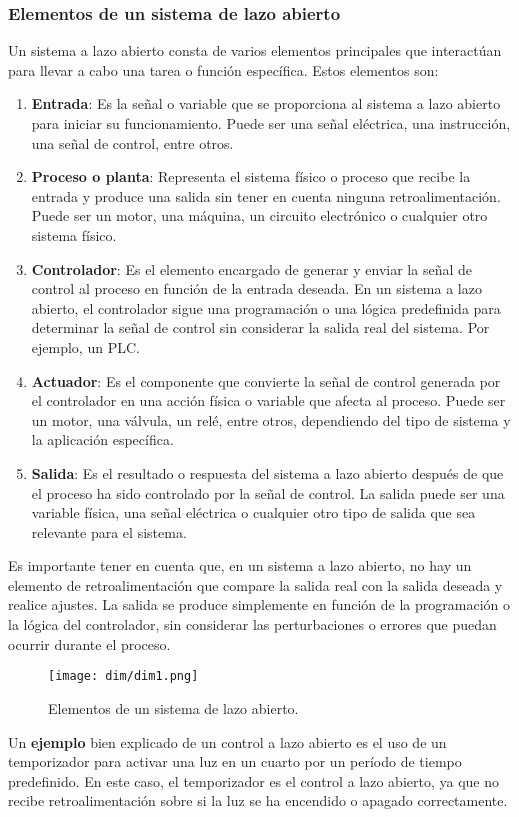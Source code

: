 \documentclass[
	12pt, %
	fleqn, %
	a4paper, %
	oneside, %
]{LegrandOrangeBook}
\begin{document}
\subsubsection{Elementos de un sistema de lazo abierto}
Un sistema a lazo abierto consta de varios elementos principales que interactúan para llevar a cabo una tarea o función específica. Estos elementos son:
\begin{enumerate}
\item \textbf{Entrada}: Es la señal o variable que se proporciona al sistema a lazo abierto para iniciar su funcionamiento. Puede ser una señal eléctrica, una instrucción, una señal de control, entre otros.
\item \textbf{Proceso o planta}: Representa el sistema físico o proceso que recibe la entrada y produce una salida sin tener en cuenta ninguna retroalimentación. Puede ser un motor, una máquina, un circuito electrónico o cualquier otro sistema físico.
\item \textbf{Controlador}: Es el elemento encargado de generar y enviar la señal de control al proceso en función de la entrada deseada. En un sistema a lazo abierto, el controlador sigue una programación o una lógica predefinida para determinar la señal de control sin considerar la salida real del sistema. Por ejemplo, un PLC.
\item \textbf{Actuador}: Es el componente que convierte la señal de control generada por el controlador en una acción física o variable que afecta al proceso. Puede ser un motor, una válvula, un relé, entre otros, dependiendo del tipo de sistema y la aplicación específica.
\item \textbf{Salida}: Es el resultado o respuesta del sistema a lazo abierto después de que el proceso ha sido controlado por la señal de control. La salida puede ser una variable física, una señal eléctrica o cualquier otro tipo de salida que sea relevante para el sistema.
\end{enumerate}
Es importante tener en cuenta que, en un sistema a lazo abierto, no hay un elemento de retroalimentación que compare la salida real con la salida deseada y realice ajustes. La salida se produce simplemente en función de la programación o la lógica del controlador, sin considerar las perturbaciones o errores que puedan ocurrir durante el proceso.
\begin{figure}[H]
\centering
\texttt{[image: dim/dim1.png]}
\caption{Elementos de un sistema de lazo abierto.}
\end{figure}
Un \textbf{ejemplo} bien explicado de un control a lazo abierto es el uso de un temporizador para activar una luz en un cuarto por un período de tiempo predefinido. En este caso, el temporizador es el control a lazo abierto, ya que no recibe retroalimentación sobre si la luz se ha encendido o apagado correctamente.\\
\end{document}
